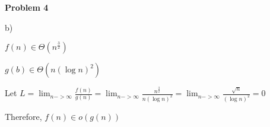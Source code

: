 \documentclass[12pt]{article}
\begin{document}
	
	\begin{center}
		{\Large\bf Problem 4}\\
		\vspace{3mm}
	\end{center}
	
	\def\question#1{\item[\bf #1.]}
	\def\part#1{\item[\bf #1)]}
	\newcommand{\pc}[1]{\mbox{\textbf{#1}}} %
	
	
	
	
	
	
	b)
	
	$f(n) \in \Theta(n^{\frac{3}{2}})$
	
	$g(b) \in \Theta(n(\log n)^2)$
	
	Let $L =\lim_{n->\infty} \frac{f(n)}{g(n)} =\lim_{n->\infty} \frac{n^\frac{3}{2}}{n(\log n)^2} =\lim_{n->\infty} \frac{\sqrt{n}}{(\log n)^2} = 0$
	
	Therefore, $f(n) \in o(g(n))$\\
	
	
	
\end{document}
